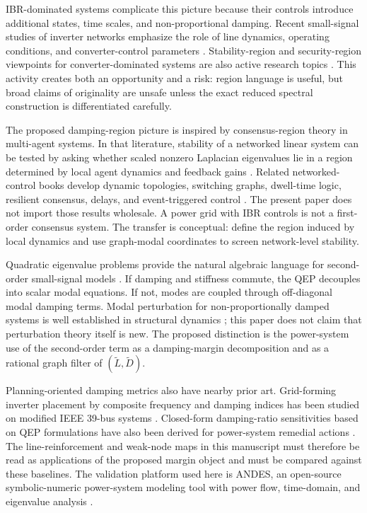 \documentclass[journal]{IEEEtran}
\newcommand{\Lt}{\widetilde L}
\newcommand{\Dt}{\widetilde D}
\begin{document}
IBR-dominated systems complicate this picture because their controls introduce additional states, time scales, and non-proportional damping. Recent small-signal studies of inverter networks emphasize the role of line dynamics, operating conditions, and converter-control parameters \cite{henriquez2022load,kravis2023inverter,nishino2025closed}. Stability-region and security-region viewpoints for converter-dominated systems are also active research topics \cite{conte2026stability,lai2026switching}. This activity creates both an opportunity and a risk: region language is useful, but broad claims of originality are unsafe unless the exact reduced spectral construction is differentiated carefully.

The proposed damping-region picture is inspired by consensus-region theory in multi-agent systems. In that literature, stability of a networked linear system can be tested by asking whether scaled nonzero Laplacian eigenvalues lie in a region determined by local agent dynamics and feedback gains \cite{li2014consensus}. Related networked-control books develop dynamic topologies, switching graphs, dwell-time logic, resilient consensus, delays, and event-triggered control \cite{wen2021dynamic,ding2022microgrids}. The present paper does not import those results wholesale. A power grid with IBR controls is not a first-order consensus system. The transfer is conceptual: define the region induced by local dynamics and use graph-modal coordinates to screen network-level stability.

Quadratic eigenvalue problems provide the natural algebraic language for second-order small-signal models \cite{tisseur2001qep}. If damping and stiffness commute, the QEP decouples into scalar modal equations. If not, modes are coupled through off-diagonal modal damping terms. Modal perturbation for non-proportionally damped systems is well established in structural dynamics \cite{pan2020modal,conde2021nonproportionality}; this paper does not claim that perturbation theory itself is new. The proposed distinction is the power-system use of the second-order term as a damping-margin decomposition and as a rational graph filter of $(\Lt,\Dt)$.

Planning-oriented damping metrics also have nearby prior art. Grid-forming inverter placement by composite frequency and damping indices has been studied on modified IEEE 39-bus systems \cite{liyanage2025gfmi}. Closed-form damping-ratio sensitivities based on QEP formulations have also been derived for power-system remedial actions \cite{setareh2025damping}. The line-reinforcement and weak-node maps in this manuscript must therefore be read as applications of the proposed margin object and must be compared against these baselines. The validation platform used here is ANDES, an open-source symbolic-numeric power-system modeling tool with power flow, time-domain, and eigenvalue analysis \cite{cui2021andes,andesdocs}.
\end{document}
